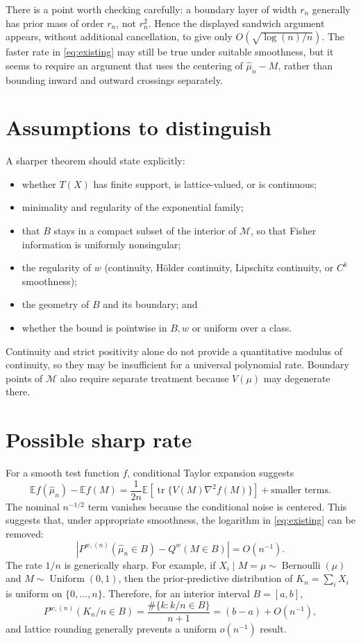 \documentclass[11pt]{article}
\newcommand{\M}{\mathcal M}
\newcommand{\E}{\mathbb E}
\begin{document}
There is a point worth checking carefully: a boundary layer of width $r_n$
generally has prior mass of order $r_n$, not $r_n^2$.  Hence the displayed
sandwich argument appears, without additional cancellation, to give only
$O(\sqrt{\log(n)/n})$.  The faster rate in \eqref{eq:existing} may still be
true under suitable smoothness, but it seems to require an argument that uses
the centering of $\widehat\mu_n-M$, rather than bounding inward and outward
crossings separately.

\section{Assumptions to distinguish}

A sharper theorem should state explicitly:
\begin{itemize}
  \item whether $T(X)$ has finite support, is lattice-valued, or is continuous;
  \item minimality and regularity of the exponential family;
  \item that $B$ stays in a compact subset of the interior of $\M$, so that
        Fisher information is uniformly nonsingular;
  \item the regularity of $w$ (continuity, H\"older continuity, Lipschitz
        continuity, or $C^k$ smoothness);
  \item the geometry of $B$ and its boundary; and
  \item whether the bound is pointwise in $B,w$ or uniform over a class.
\end{itemize}
Continuity and strict positivity alone do not provide a quantitative modulus
of continuity, so they may be insufficient for a universal polynomial rate.
Boundary points of $\M$ also require separate treatment because $V(\mu)$ may
degenerate there.

\section{Possible sharp rate}

For a smooth test function $f$, conditional Taylor expansion suggests
\begin{equation}\label{eq:generator}
  \E f(\widehat\mu_n)-\E f(M)
  =\frac1{2n}\E\!\left[
    \operatorname{tr}\{V(M)\nabla^2f(M)\}
  \right]+\text{smaller terms}.
\end{equation}
The nominal $n^{-1/2}$ term vanishes because the conditional noise is
centered.  This suggests that, under appropriate smoothness, the logarithm in
\eqref{eq:existing} can be removed:
\[
  \left|P^{w,(n)}(\widehat\mu_n\in B)-Q^w(M\in B)\right|=O(n^{-1}).
\]
The rate $1/n$ is generically sharp.  For example, if
$X_i\mid M=\mu\sim\operatorname{Bernoulli}(\mu)$ and
$M\sim\operatorname{Uniform}(0,1)$, then the prior-predictive distribution of
$K_n=\sum_iX_i$ is uniform on $\{0,\ldots,n\}$.  Therefore, for an interior
interval $B=[a,b]$,
\[
  P^{w,(n)}(K_n/n\in B)
  =\frac{\#\{k:k/n\in B\}}{n+1}
  =(b-a)+O(n^{-1}),
\]
and lattice rounding generally prevents a uniform $o(n^{-1})$ result.
\end{document}
